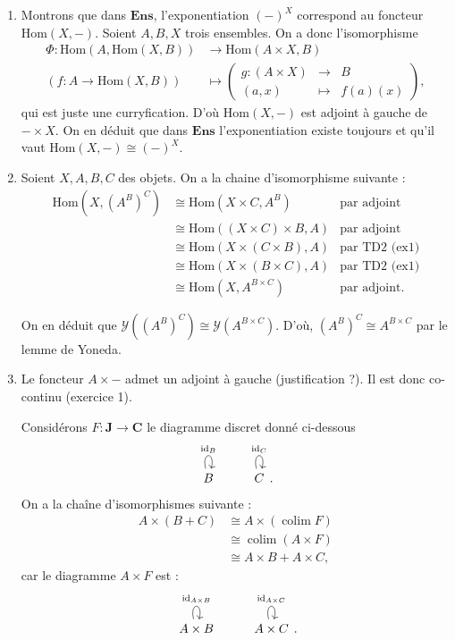 \documentclass{../../td}
\begin{document}
  \begin{enumerate}
    \item Montrons que dans $\mathbf{Ens}$, l'exponentiation $(-)^X$ correspond au foncteur $\mathrm{Hom}(X, -)$.
      Soient $A,B,X$ trois ensembles.
      On a donc l'isomorphisme
      \begin{align*}
        \Phi: \mathrm{Hom}(A, \mathrm{Hom}(X, B)) &\longrightarrow \mathrm{Hom}(A \times X, B) \\
        (f : A \to \mathrm{Hom}(X, B)) &\longmapsto \left(
        \begin{array}{rcl}
          g : (A \times X) & \to & B\\
          (a,x) &\mapsto & f(a)(x)
        \end{array}
        \right)
      ,\end{align*}
      qui est juste une curryfication.
      D'où $\mathrm{Hom}(X, -)$ est adjoint à gauche de $- \times X$.
      On en déduit que dans $\mathbf{Ens}$ l'exponentiation existe toujours et qu'il vaut $\mathrm{Hom}(X, -) \cong (-)^X$.
    \item Soient $X,A,B,C$ des objets.
      On a la chaine d'isomorphisme suivante :
      \begin{align*}
        \mathrm{Hom}(X, (A^B)^C) &\cong \mathrm{Hom}(X \times C, A^B) & \text{par adjoint}\\
        &\cong \mathrm{Hom}((X \times C) \times B, A) & \text{par adjoint}\\
        &\cong \mathrm{Hom}(X \times (C \times B), A) & \text{par TD2 (ex1)}\\
        &\cong \mathrm{Hom}(X \times (B \times C), A) & \text{par TD2 (ex1)}\\
        &\cong \mathrm{Hom}(X, A^{B \times C}) & \text{par adjoint}
      .\end{align*}

      On en déduit que $\mathcal{Y}((A^{B})^{C}) \cong \mathcal{Y}(A^{B \times C})$.
      D'où, $(A^B)^C \cong A^{B \times C}$ par le lemme de Yoneda.
    \item Le foncteur $A \times -$ admet un adjoint à gauche (justification ?).
      Il est donc co-continu (exercice 1).

      Considérons $F : \mathbf{J} \to \mathbf{C}$ le diagramme discret  donné ci-dessous \[
      \begin{tikzcd}
        B\arrow[loop above]{}{\mathrm{id}_B} & 
        C\arrow[loop above]{}{\mathrm{id}_C}
      \end{tikzcd}
      .\]
      On a la chaîne d'isomorphismes suivante :
      \begin{align*}
        A \times (B + C) &\cong A \times (\operatorname{colim} F)\\
        &\cong \operatorname{colim} (A \times F)\\
        &\cong A \times B + A \times C
      ,\end{align*}
      car le diagramme $A \times F$ est :\[
      \begin{tikzcd}
        A \times B\arrow[loop above]{}{\mathrm{id}_{A \times B}} & 
        A \times C\arrow[loop above]{}{\mathrm{id}_{A \times C}}
      \end{tikzcd}
      .\]
  \end{enumerate}
\end{document}
